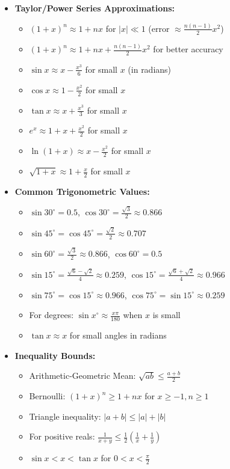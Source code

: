 \documentclass[12pt]{article}
\begin{document}
\begin{itemize}
    \item \textbf{Taylor/Power Series Approximations:}
    \begin{itemize}
        \item $(1+x)^n \approx 1 + nx$ for $|x| \ll 1$ (error $\approx \frac{n(n-1)}{2}x^2$)
        \item $(1+x)^n \approx 1 + nx + \frac{n(n-1)}{2}x^2$ for better accuracy
        \item $\sin x \approx x - \frac{x^3}{6}$ for small $x$ (in radians)
        \item $\cos x \approx 1 - \frac{x^2}{2}$ for small $x$
        \item $\tan x \approx x + \frac{x^3}{3}$ for small $x$
        \item $e^x \approx 1 + x + \frac{x^2}{2}$ for small $x$
        \item $\ln(1+x) \approx x - \frac{x^2}{2}$ for small $x$
        \item $\sqrt{1+x} \approx 1 + \frac{x}{2}$ for small $x$
    \end{itemize}
    
    \item \textbf{Common Trigonometric Values:}
    \begin{itemize}
        \item $\sin 30^\circ = 0.5$, $\cos 30^\circ = \frac{\sqrt{3}}{2} \approx 0.866$
        \item $\sin 45^\circ = \cos 45^\circ = \frac{\sqrt{2}}{2} \approx 0.707$
        \item $\sin 60^\circ = \frac{\sqrt{3}}{2} \approx 0.866$, $\cos 60^\circ = 0.5$
        \item $\sin 15^\circ = \frac{\sqrt{6}-\sqrt{2}}{4} \approx 0.259$, $\cos 15^\circ = \frac{\sqrt{6}+\sqrt{2}}{4} \approx 0.966$
        \item $\sin 75^\circ = \cos 15^\circ \approx 0.966$, $\cos 75^\circ = \sin 15^\circ \approx 0.259$
        \item For degrees: $\sin x^\circ \approx \frac{x \pi}{180}$ when $x$ is small
        \item $\tan x \approx x$ for small angles in radians
    \end{itemize}
    
    \item \textbf{Inequality Bounds:}
    \begin{itemize}
        \item Arithmetic-Geometric Mean: $\sqrt{ab} \leq \frac{a+b}{2}$
        \item Bernoulli: $(1+x)^n \geq 1+nx$ for $x \geq -1, n \geq 1$
        \item Triangle inequality: $|a+b| \leq |a| + |b|$
        \item For positive reals: $\frac{1}{x+y} \leq \frac{1}{2}\left(\frac{1}{x} + \frac{1}{y}\right)$
        \item $\sin x < x < \tan x$ for $0 < x < \frac{\pi}{2}$
    \end{itemize}
    

\end{itemize}
\end{document}
